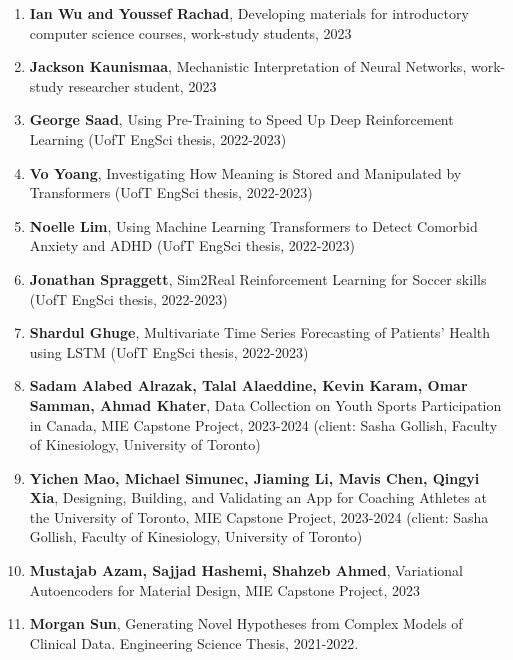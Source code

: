 \documentclass[letterpaper,11pt]{article}
\begin{document}
\begin{enumerate}
	\item
	\textbf{Ian Wu and Youssef Rachad}, Developing materials for introductory computer science courses, work-study students, 2023

	\item
	\textbf{Jackson Kaunismaa},  Mechanistic Interpretation of Neural Networks, work-study researcher student, 2023

	\item 
	\textbf{George Saad}, Using Pre-Training to Speed Up Deep Reinforcement Learning (UofT EngSci thesis, 2022-2023)
	\item 
	\textbf{Vo Yoang}, Investigating How Meaning is Stored and Manipulated by Transformers (UofT EngSci thesis, 2022-2023)
	\item 
	\textbf{Noelle Lim}, Using Machine Learning Transformers to Detect Comorbid Anxiety and ADHD (UofT EngSci thesis, 2022-2023)
	\item 
	\textbf{Jonathan Spraggett}, Sim2Real Reinforcement Learning for Soccer skills (UofT EngSci thesis, 2022-2023)
	\item 
	\textbf{Shardul Ghuge}, Multivariate Time Series Forecasting of Patients' Health using LSTM (UofT EngSci thesis, 2022-2023)






\item
\textbf{Sadam Alabed Alrazak, Talal Alaeddine, Kevin Karam, Omar Samman, Ahmad Khater}, Data Collection on Youth Sports Participation in Canada, MIE Capstone Project, 2023-2024 (client: Sasha Gollish, Faculty of Kinesiology, University of Toronto)

\item
\textbf{Yichen Mao, Michael Simunec, Jiaming Li, Mavis Chen, Qingyi Xia}, Designing, Building, and Validating an App for Coaching Athletes at the University of Toronto, MIE Capstone Project, 2023-2024 (client: Sasha Gollish, Faculty of Kinesiology, University of Toronto)

\item
\textbf{Mustajab Azam, Sajjad Hashemi, Shahzeb Ahmed}, Variational Autoencoders for Material Design, MIE Capstone Project, 2023

\item
\textbf{Morgan Sun}, Generating Novel Hypotheses from Complex Models of Clinical Data. Engineering Science Thesis, 2021-2022. 



\end{enumerate}
\end{document}
